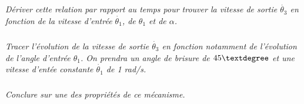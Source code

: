 \documentclass[11pt,oneside]{article}
\begin{document}
\subparagraph{}
\textit{Dériver cette relation par rapport au temps pour trouver la vitesse de sortie $\dot{\theta_3}$ en fonction de la vitesse d’entrée $\dot{\theta_1}$, de $\theta_1$ et de $\alpha$.}


\subparagraph{}
\textit{Tracer l’évolution de la vitesse de sortie $\dot{\theta_3}$ en fonction notamment de l’évolution de l’angle d’entrée $\theta_1$. On prendra un angle de brisure de $45\textdegree$ et une vitesse d’entée constante $\dot{\theta_1}$ de 1 rad/s.}

\subparagraph{}
\textit{Conclure sur une des propriétés de ce mécanisme.}
\end{document}
